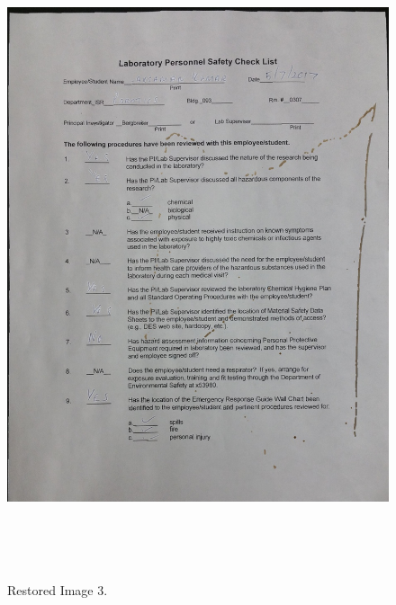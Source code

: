 \begin{figure}[th]
	\centering
	\includegraphics[height=19cm ]{Figures/restored_image3}
	\caption[Restored Image 3]{Restored Image 3.}
	\label{fig:RestoredImage3}
\end{figure}



